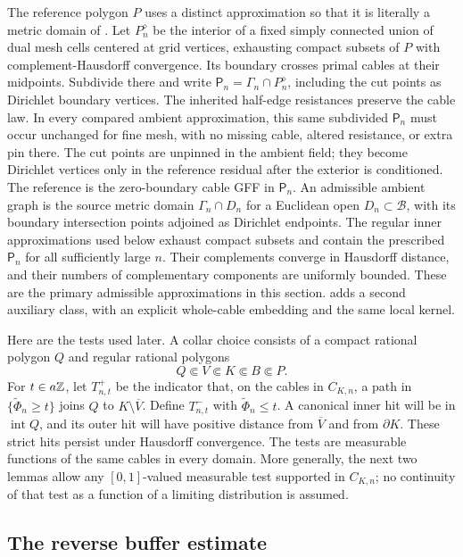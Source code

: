 The reference polygon \(P\) uses a distinct approximation so that it
is literally a metric domain of \cite[Section~4.1]{ALS2018}. Let
\(P_n^\diamond\) be the interior of a fixed simply connected union of dual
mesh cells centered at grid vertices, exhausting compact subsets of
\(P\) with complement-Hausdorff convergence. Its boundary crosses
primal cables at their midpoints. Subdivide there and write
\(\mathsf P_n=\Gamma_n\cap P_n^\diamond\), including the cut points
as Dirichlet boundary vertices. The inherited half-edge resistances
preserve the cable law. In every compared ambient approximation,
this same subdivided \(\mathsf P_n\) must occur unchanged for fine
mesh, with no missing cable, altered resistance, or extra pin there.
The cut points are unpinned in the ambient field; they become Dirichlet
vertices only in the reference residual after the exterior is conditioned.
The reference is the zero-boundary cable GFF in \(\mathsf P_n\).
An admissible ambient graph is the source metric domain
\(\Gamma_n\cap D_n\) for a Euclidean open \(D_n\subset\mathcal B\),
with its boundary intersection points adjoined as Dirichlet endpoints.
The regular inner approximations used below exhaust compact subsets
and contain the prescribed \(\mathsf P_n\) for all sufficiently large
\(n\). Their complements converge in Hausdorff distance, and their
numbers of complementary components are uniformly bounded. These are
the primary admissible approximations in this section.
 adds a second auxiliary class, with an
explicit whole-cable embedding and the same local kernel.

Here are the tests used later. A collar choice consists of a compact
rational polygon \(Q\) and regular rational polygons
\[
             Q\Subset V\Subset K\Subset B\Subset P.
\]
For \(t\in a\mathbb Z\), let \(T_{n,t}^{+}\) be the indicator that, on the
cables in \(C_{K,n}\), a path in \(\{\widetilde\Phi_n\ge t\}\) joins
\(Q\) to \(K\setminus\overline V\). Define \(T_{n,t}^{-}\) with
\(\widetilde\Phi_n\le t\). A canonical inner hit will be in
\(\operatorname{int}Q\), and its outer hit will have positive distance
from \(\overline V\) and from \(\partial K\). These strict hits persist
under Hausdorff convergence. The tests are measurable functions of the
same cables in every domain. More generally, the next two lemmas allow
any \([0,1]\)-valued measurable test supported in \(C_{K,n}\); no
continuity of that test as a function of a limiting distribution is
assumed.

\subsection{The reverse buffer estimate}

